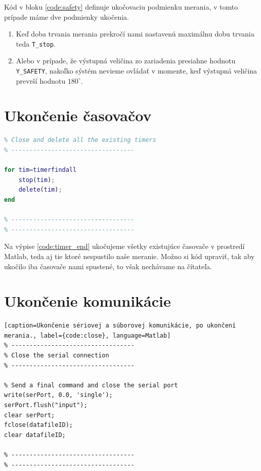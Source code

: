 \documentclass[a4paper, 10pt, ]{article}
\begin{document}
Kód v bloku \ref{code:safety} definuje ukočovaciu podmienku merania, v tomto prípade máme dve podmienky ukočenia.

\begin{enumerate}
    \item Keď doba trvania merania prekročí nami nastavenú maximálnu dobu trvania teda \texttt{T\_stop}.
    \item Alebo v prípade, že výstupná veličina zo zariadenia presiahne hodnotu \texttt{Y\_SAFETY}, nakoľko sýstém nevieme ovládať v momente, keď výstupná veličina prevrší hodnotu $180^\circ$.
\end{enumerate}

\section{Ukončenie časovačov}
\begin{lstlisting}[caption=Ukončenie a odstránenie všetkých aktívnych Matlab časovačov., label={code:timer_end}, language=Matlab]
% ----------------------------------
% Close and delete all the existing timers
% ----------------------------------

for tim=timerfindall
    stop(tim);
    delete(tim);
end

% ----------------------------------
% ----------------------------------
\end{lstlisting}

Na výpise \ref{code:timer_end} ukočujeme všetky existujúce časovače v prostredí Matlab, teda aj tie ktoré nespustilo naše meranie. Možno si kód upraviť, tak aby ukočilo iba časovače nami spustené, to však nechávame na čítateľa.

\section{Ukončenie komunikácie}
\begin{lstlisting}[caption=Ukončenie sériovej a súborovej komunikácie, po ukončení merania., label={code:close}, language=Matlab]
% ----------------------------------
% Close the serial connection
% ----------------------------------

% Send a final command and close the serial port
write(serPort, 0.0, 'single');
serPort.flush("input");
clear serPort;
fclose(datafileID);
clear datafileID;

% ----------------------------------
% ----------------------------------
\end{lstlisting}
\end{document}
